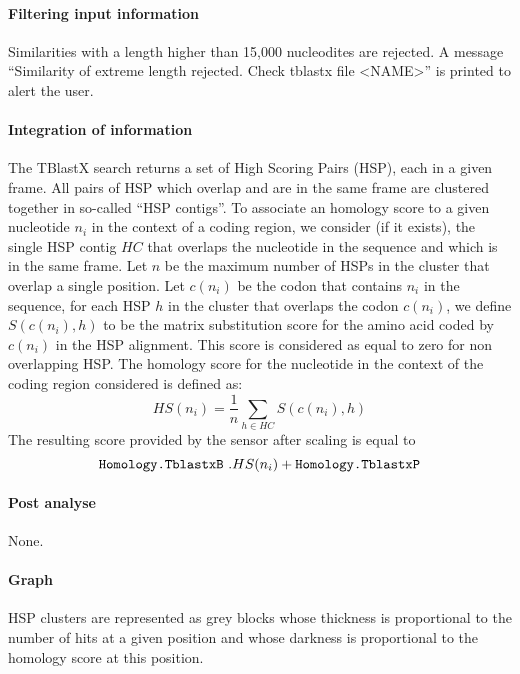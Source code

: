 \paragraph{Filtering input information}

Similarities with a length higher than 15,000 nucleodites are
rejected. A message ``Similarity of extreme length rejected. Check
tblastx file <NAME>'' is printed to alert the user.

\paragraph{Integration of information}

The TBlastX search returns a set of High Scoring Pairs (HSP), each in
a given frame. All pairs of HSP which overlap and are in the same
frame are clustered together in so-called ``HSP contigs''. To
associate an homology score to a given nucleotide $n_i$ in the context
of a coding region, we consider (if it exists), the single HSP contig
$HC$ that overlaps the nucleotide in the sequence and which is in the
same frame. Let $n$ be the maximum number of HSPs in the cluster that
overlap a single position. Let $c(n_i)$ be the codon that contains
$n_i$ in the sequence, for each HSP $h$ in the cluster that overlaps
the codon $c(n_i)$, we define $S(c(n_i),h)$ to be the matrix
substitution score for the amino acid coded by $c(n_i)$ in the HSP
alignment. This score is considered as equal to zero for non
overlapping HSP. The homology score for the nucleotide in the context
of the coding region considered is defined as:
\[HS(n_i) = \frac{1}{n}\sum_{h\in HC} S(c(n_i),h)\]
The resulting score provided by the sensor after scaling is equal to
\[\mbox{\texttt{Homology.TblastxB}}\ . HS(n_i) + \mbox{\texttt{Homology.TblastxP}}\]

\paragraph{Post analyse}

None.

\paragraph{Graph}

HSP clusters are represented as grey blocks whose thickness is
proportional to the number of hits at a given position and whose
darkness is proportional to the homology score at this position.
